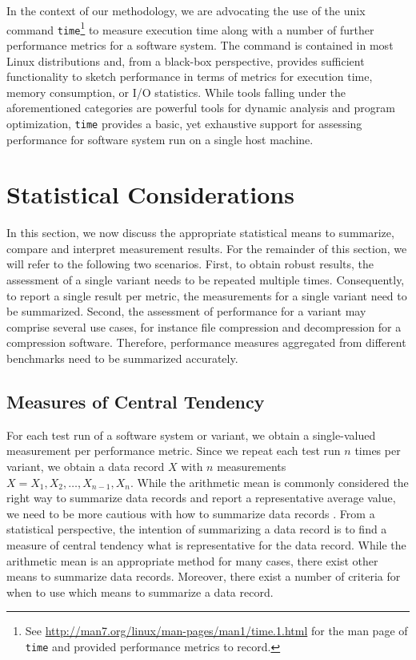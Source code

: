 In the context of our methodology, we are advocating the use of the unix
command \texttt{time}\footnote{See
\url{http://man7.org/linux/man-pages/man1/time.1.html} for the man page of
\texttt{time} and provided performance metrics to record.} to measure execution
time along with a number of further performance metrics for a software system.
The command is contained in most Linux distributions and, from a black-box
perspective, provides sufficient functionality to sketch performance in terms of
metrics for execution time, memory consumption, or I/O statistics. While tools falling under the aforementioned categories are powerful tools for dynamic analysis and program
optimization, \texttt{time} provides a basic, yet exhaustive support for
assessing performance for software system run on a single host machine. 

\section{Statistical Considerations}\label{sec:statistical_considerations}
In this section, we now discuss the appropriate statistical means to summarize,
compare and interpret measurement results. For the remainder of this section, we
will refer to the following two scenarios. First, to obtain robust results, the
assessment of a single variant needs to be repeated multiple times.
Consequently, to report a single result per metric, the measurements for a
single variant need to be summarized. Second, the assessment of performance for
a variant may comprise several use cases, for instance file
compression and decompression for a compression software. Therefore, performance measures
aggregated from different benchmarks need to be summarized accurately. 

\subsection{Measures of Central Tendency}
For each test run of a software system or variant, we obtain a single-valued
measurement per performance metric. Since we repeat each test run $n$ times
per variant, we obtain a data record $X$ with $n$ measurements $X = X_1, X_2,
\ldots, X_{n-1}, X_n$. While the arithmetic mean is commonly considered the
right way to summarize data records and report a representative average
value, we need to be more cautious with how to summarize data records
\citep{fleming_how_1986,smith_characterizing_1988}. From a statistical
perspective, the intention of summarizing a data record is to find a measure of
central tendency what is representative for the data record.
While the arithmetic mean is an appropriate method for many cases, there exist
other means to summarize data records. Moreover, there exist a number of
criteria for when to use which means to summarize a data record. 

